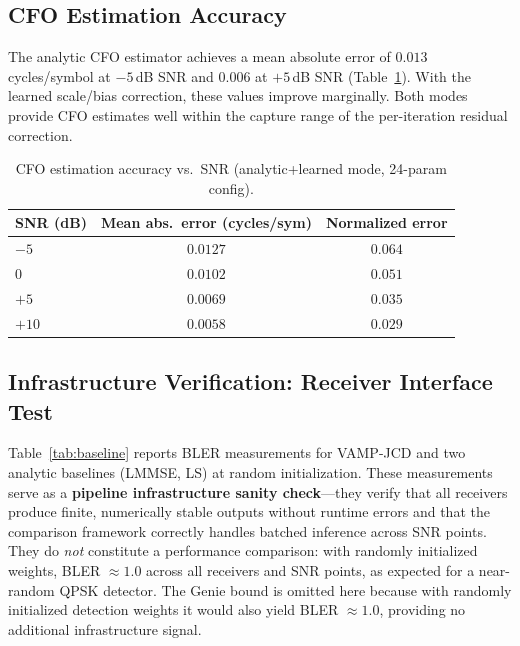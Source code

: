 \documentclass{article}
\begin{document}
\subsection{CFO Estimation Accuracy}

The analytic CFO estimator achieves a mean absolute error of $0.013$ cycles/symbol at $-5$\,dB SNR and $0.006$ at $+5$\,dB SNR (Table~\ref{tab:cfo}). With the learned scale/bias correction, these values improve marginally. Both modes provide CFO estimates well within the capture range of the per-iteration residual correction.

\begin{table}[h]
  \centering
  \caption{CFO estimation accuracy vs.\ SNR (analytic+learned mode, 24-param config).}
  \label{tab:cfo}
  \begin{tabular}{@{}lcc@{}}
    \toprule
    SNR (dB) & Mean abs.\ error (cycles/sym) & Normalized error \\
    \midrule
    $-5$ & $0.0127$ & $0.064$ \\
    $0$  & $0.0102$ & $0.051$ \\
    $+5$ & $0.0069$ & $0.035$ \\
    $+10$ & $0.0058$ & $0.029$ \\
    \bottomrule
  \end{tabular}
\end{table}

\subsection{Infrastructure Verification: Receiver Interface Test}
\label{sec:infra_check}

Table~\ref{tab:baseline} reports BLER measurements for VAMP-JCD and two analytic baselines (LMMSE, LS) at random initialization. These measurements serve as a \textbf{pipeline infrastructure sanity check}---they verify that all receivers produce finite, numerically stable outputs without runtime errors and that the comparison framework correctly handles batched inference across SNR points. They do \emph{not} constitute a performance comparison: with randomly initialized weights, BLER $\approx 1.0$ across all receivers and SNR points, as expected for a near-random QPSK detector. The Genie bound is omitted here because with randomly initialized detection weights it would also yield BLER $\approx 1.0$, providing no additional infrastructure signal.
\end{document}
